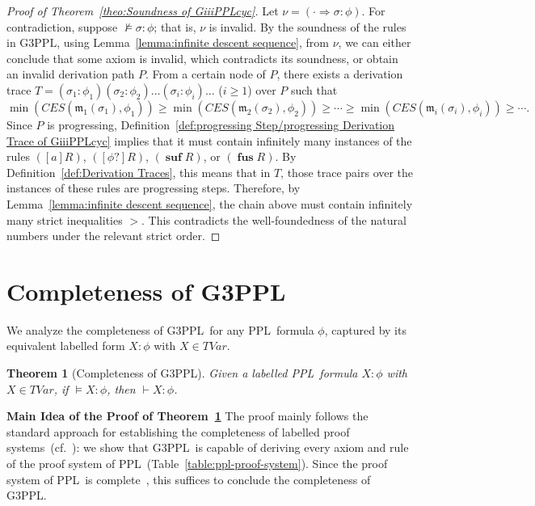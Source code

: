 \documentclass[manuscript,screen]{acmart}
\newtheorem{theorem}{Theorem}[section]
\newcommand{\mfr}[1]{\mathfrak{#1}}
\newcommand{\lm}[0]{\mfr{m}}
\newcommand{\EX}[0]{\textit{CES}}
\newcommand{\GiiiPPLcyc}[0]{\mbox{G3PPL}}
\DeclareMathOperator{\osuf}{\mathbf{suf}}
\DeclareMathOperator{\ofus}{\mathbf{fus}}
\newcommand{\TVar}[0]{\textit{TVar}}
\newcommand{\PPL}[0]{\mbox{PPL}}
\begin{document}
\begin{proof}[Proof of Theorem~\ref{theo:Soundness of GiiiPPLcyc}]
    Let $\nu = (\cdot \Rightarrow \sigma : \phi)$. 
For contradiction, suppose $\not\models \sigma : \phi$; that is, $\nu$ is invalid. 
    By the soundness of the rules in $\GiiiPPLcyc$, 
    using Lemma~\ref{lemma:infinite descent sequence}, from $\nu$, we can either conclude that some axiom is invalid, which contradicts its soundness, or obtain an invalid derivation path $P$. From a certain node of $P$, there exists a derivation trace $T=(\sigma_1 : \phi_1)(\sigma_2 : \phi_2)\ldots(\sigma_i : \phi_i)\ldots$ ($i\ge 1$) over $P$ such that $$\min(\EX(\lm_1(\sigma_1), \phi_1)) \ge \min(\EX(\lm_2(\sigma_2), \phi_2))\ge\cdots\ge \min(\EX(\lm_i(\sigma_i), \phi_i))\ge\cdots.$$ 
Since $P$ is progressing, Definition~\ref{def:progressing Step/progressing Derivation Trace of GiiiPPLcyc} implies that it must contain infinitely many instances of the rules $([a]R)$, $([\phi?]R)$, $(\osuf R)$, or $(\ofus R)$. 
    By Definition~\ref{def:Derivation Traces}, this means that in $T$, those trace pairs over the instances of these rules are progressing steps. 
Therefore, by Lemma~\ref{lemma:infinite descent sequence}, the chain above must contain infinitely many strict inequalities $>$. 
This contradicts the well-foundedness of the natural numbers under the relevant strict order. 
    
\end{proof}




\section{Completeness of \GiiiPPLcyc}
\label{section:Completeness of GiiiPPLcyc}

We analyze the completeness of \GiiiPPLcyc\ for any \PPL\ formula $\phi$, captured by its equivalent labelled form $X : \phi$ with $X\in \TVar$.

\begin{theorem}[Completeness of \GiiiPPLcyc]
    \label{theo:Completeness of GiiiPPLcyc}
    Given a labelled \PPL\ formula $X : \phi$ with $X\in \TVar$, if $\models X : \phi$, then $\vdash X : \phi$. 
\end{theorem}

\textbf{Main Idea of the Proof of Theorem~\ref{theo:Completeness of GiiiPPLcyc}}
The proof mainly follows the standard approach for establishing the completeness of labelled proof systems~(cf.~\cite{Docherty19,Brotherston08}): we show that \GiiiPPLcyc\ is capable of deriving every axiom and rule of the proof system of \PPL\ (Table~\ref{table:ppl-proof-system}).  Since the proof system of \PPL\ is complete~\cite{Harel00}, this suffices to conclude the completeness of \GiiiPPLcyc. 
\end{document}

